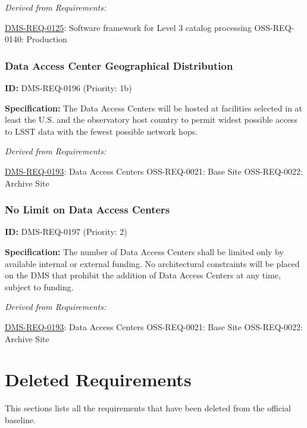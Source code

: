 \documentclass[SE,toc,lsstdraft]{lsstdoc}
\begin{document}
\emph{Derived from Requirements:}

\hyperref[DMS-REQ-0125]{DMS-REQ-0125}:
Software framework for Level 3 catalog processing \newline
OSS-REQ-0140:
Production \newline

\subsubsection{Data Access Center Geographical Distribution}

\label{DMS-REQ-0196}
\textbf{ID:} DMS-REQ-0196 (Priority: 1b)

\textbf{Specification:} The Data Access Centers will be hosted at facilities selected in at least the U.S. and the observatory host country to permit widest possible access to LSST data with the fewest possible network hops.

\emph{Derived from Requirements:}

\hyperref[DMS-REQ-0193]{DMS-REQ-0193}:
Data Access Centers \newline
OSS-REQ-0021:
Base Site \newline
OSS-REQ-0022:
Archive Site \newline

\subsubsection{No Limit on Data Access Centers}

\label{DMS-REQ-0197}
\textbf{ID:} DMS-REQ-0197 (Priority: 2)

\textbf{Specification: }The number of Data Access Centers shall be limited only by available internal or external funding.  No architectural constraints will be placed on the DMS that prohibit the addition of Data Access Centers at any time, subject to funding.

\emph{Derived from Requirements:}

\hyperref[DMS-REQ-0193]{DMS-REQ-0193}:
Data Access Centers \newline
OSS-REQ-0021:
Base Site \newline
OSS-REQ-0022:
Archive Site \newline

\section{Deleted Requirements}

This sections lists all the requirements that have been deleted from the official baseline.
\end{document}
